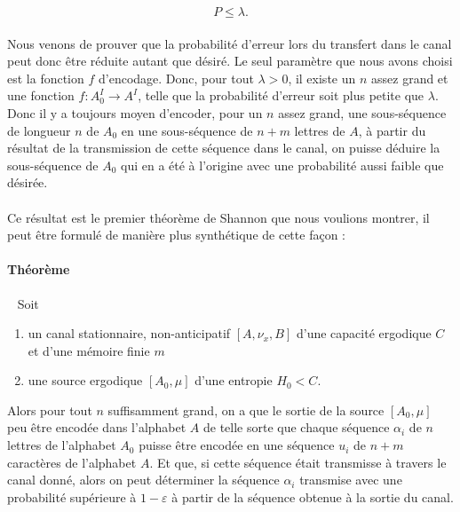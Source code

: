 	\[P\le \lambda.\]
	
	\paragraph{}Nous venons de prouver que la probabilité d'erreur lors du
	transfert dans le canal peut donc être réduite autant que désiré.
	Le seul paramètre que nous avons choisi est la fonction $f$ d'encodage.
	Donc, pour tout $\lambda >0$, il existe un $n$ assez grand et
	une fonction $f : A_0^I \to A^I$, telle que la probabilité d'erreur 
	soit plus petite que $\lambda$. Donc il y a toujours moyen d'encoder,
	pour un $n$ assez grand, une sous-séquence de longueur $n$ de $A_0$ 
	en une sous-séquence de $n+m$ lettres de $A$, à partir du résultat 
	de la transmission de cette séquence dans le canal, on puisse déduire
	la sous-séquence de $A_0$ qui en a été à l'origine avec une 
	probabilité aussi faible que désirée.
	
	\paragraph{}
	Ce résultat est le premier théorème de Shannon que nous voulions montrer,
	il peut être formulé de manière plus synthétique de cette façon :
	
	\paragraph{Théorème}\ 
	\newline
	Soit 
	\begin{enumerate}
		\item un canal stationnaire, non-anticipatif $[A,\nu_x,B]$ d'une 
			capacité ergodique $C$ et d'une mémoire finie $m$
		\item une source ergodique $[A_0,\mu]$ d'une entropie $H_0<C$.
	\end{enumerate}
	Alors pour tout $n$ suffisamment grand, on a que le sortie de la source
	$[A_0,\mu]$ peu être encodée dans l'alphabet $A$ de telle sorte que
	chaque séquence $\alpha_i$ de $n$ lettres de l'alphabet $A_0$ puisse
	être encodée en une séquence $u_i$ de $n+m$ caractères de l'alphabet $A$. 
	Et que, si cette séquence était transmisse à travers le canal donné, alors
	on peut déterminer la séquence $\alpha_i$ transmise avec une probabilité 
	supérieure à $1-\varepsilon$ à partir de la séquence obtenue à la sortie 
	du canal.
	
